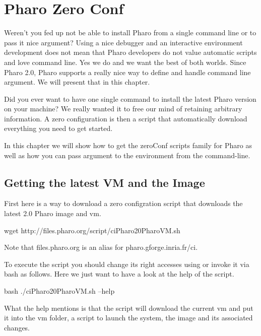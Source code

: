 \documentclass[a4paper,10pt,twoside]{book}
\begin{document}
\fi
\sloppy

\chapter{Pharo Zero Conf}


Weren't you fed up not be able to install Pharo from a single command line or to pass it nice argument? 
Using a nice debugger and an interactive environment development does not 
mean that Pharo developers do not value automatic scripts and love command line. Yes we do and we want the best of
both worlds.
Since Pharo 2.0, Pharo supports a really nice way to define and handle command line argument. 
We will present that in this chapter. 

Did you ever want to have one single command to install the latest Pharo version on your machine?
We really wanted it to free our mind of retaining arbitrary information. 
A zero configuration is then a script that automatically download everything you need to get started. 

In this chapter we will show how to get the zeroConf scripts family for Pharo as well as how you can 
pass argument to the environment from the command-line.



\section{Getting the latest VM and the Image}
First here is a way to download a zero configration script that downloads the latest 2.0 Pharo image and vm. 

\begin{code}{}
wget http://files.pharo.org/script/ciPharo20PharoVM.sh
\end{code}

Note that files.pharo.org is an alias for pharo.gforge.inria.fr/ci.

To execute the script you should change its right accesses using   or invoke it via bash as follows. Here we just want to have a look at the help of the script.

\begin{code}{}
bash ./ciPharo20PharoVM.sh --help 
\end{code}

What the help mentions is that the script will download the current vm and put it into the vm folder, a script to launch the system, the image and its associated changes. 
\end{document}
